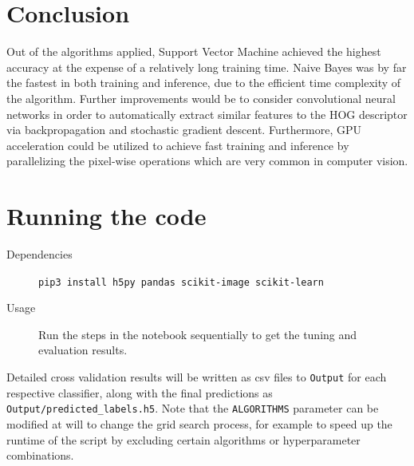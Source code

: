 \documentclass[landscape,twocolumn]{article}
\begin{document}
\section{Conclusion}
Out of the algorithms applied, Support Vector Machine achieved the highest accuracy at the expense of a relatively long training time. Naive Bayes was by far the fastest in both training and inference, due to the efficient time complexity of the algorithm. Further improvements would be to consider convolutional neural networks in order to automatically extract similar features to the HOG descriptor via backpropagation and stochastic gradient descent. Furthermore, GPU acceleration could be utilized to achieve fast training and inference by parallelizing the pixel-wise operations which are very common in computer vision.

\printbibliography\appendix
\section{Running the code}
\begin{description}
	\item[Dependencies] \texttt{pip3 install h5py pandas scikit-image scikit-learn}
	\item[Usage] Run the steps in the notebook sequentially to get the tuning and evaluation results.
\end{description}

Detailed cross validation results will be written as csv files to \texttt{Output} for each respective classifier, along with the final predictions as \texttt{Output/predicted\_labels.h5}. Note that the \texttt{ALGORITHMS} parameter can be modified at will to change the grid search process, for example to speed up the runtime of the script by excluding certain algorithms or hyperparameter combinations.
\end{document}
